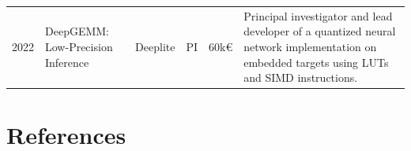 \documentclass[11pt]{report}
\begin{document}
\begin{landscape}
{\begin{longtable}{|c|l|p{3cm}|p{1cm}|p{1.5cm}|p{6.5cm}|}
      2022          & DeepGEMM: Low-Precision Inference       & Deeplite              & PI            & 60k€                 & Principal investigator and lead developer of a quantized neural network implementation on embedded targets using LUTs and SIMD instructions.                                                                                                     \\
    \end{longtable}
  }
\end{landscape}


\section{References}
\printbibliography[keyword={REFERENCE}, heading=none]
\end{document}
